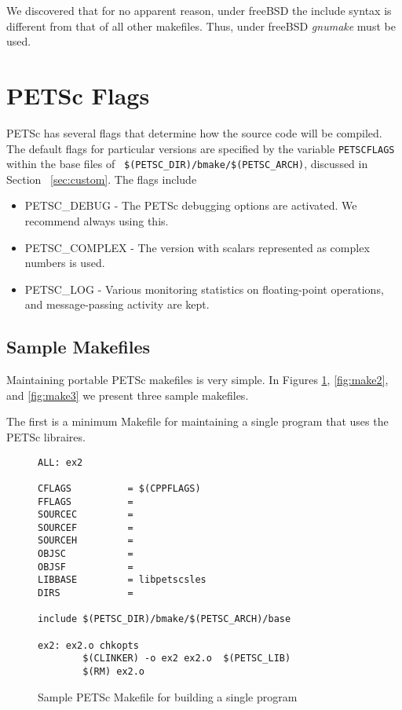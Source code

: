 We discovered that for no apparent reason, under freeBSD the include 
syntax is different from that of all other makefiles. Thus, under 
freeBSD {\em gnumake} must be used.

\section{PETSc Flags}
\label{sec:makeflags}

PETSc has several flags that determine how the source code will be
compiled.  The default flags for particular versions are specified by
the variable {\tt PETSCFLAGS} within the base files of {\tt
\$(PETSC\_DIR)/bmake/\$(PETSC\_ARCH)}, discussed in Section
~\ref{sec:custom}.  The flags include
\begin{itemize}
\item PETSC\_DEBUG - The PETSc debugging options are activated. We 
      recommend always using this. 
\item PETSC\_COMPLEX - The version with scalars represented 
      as complex numbers is used. 
\item PETSC\_LOG - Various monitoring statistics on floating-point operations,
      and message-passing activity are kept. 
\end{itemize}

\subsection{Sample Makefiles}

Maintaining portable PETSc makefiles is very simple. In Figures
\ref{fig:make1}, \ref{fig:make2}, and \ref{fig:make3} we present three sample
makefiles.  

The first is a minimum Makefile for maintaining a single program that uses
the PETSc libraires.
\begin{figure}[H]
{\small
\begin{verbatim}
ALL: ex2

CFLAGS          = $(CPPFLAGS) 
FFLAGS          = 
SOURCEC         = 
SOURCEF         =
SOURCEH         =
OBJSC           =
OBJSF           = 
LIBBASE         = libpetscsles
DIRS            = 

include $(PETSC_DIR)/bmake/$(PETSC_ARCH)/base

ex2: ex2.o chkopts
        $(CLINKER) -o ex2 ex2.o  $(PETSC_LIB)
        $(RM) ex2.o
\end{verbatim}
}
\caption{Sample PETSc Makefile for building a single program}
\label{fig:make1}
\end{figure}

